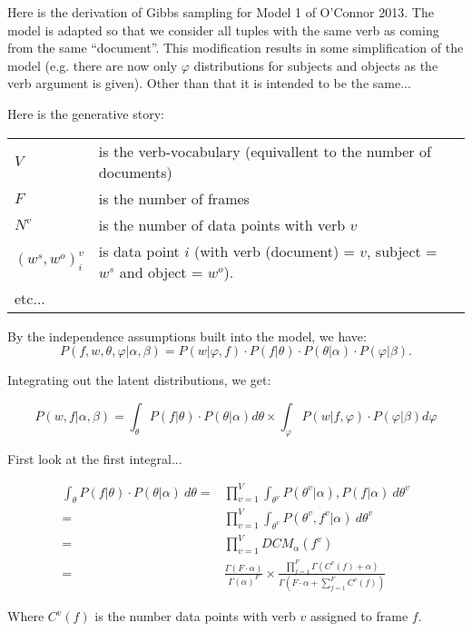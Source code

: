 \documentclass{article}
\renewcommand\phi\varphi
\begin{document}
Here is the derivation of Gibbs sampling for Model 1 of O'Connor 2013.
The model is adapted so that we consider all tuples with the same verb as coming
from the same ``document''.
This modification results in some simplification of the model (e.g. there are now
only $\phi$ distributions for subjects and objects as the verb argument is given).
Other than that it is intended to be the same...

Here is the generative story:



\begin{table}[h]
\begin{tabular}{ll}
$V$ & is the verb-vocabulary (equivallent to the number of documents)\\
$F$ & is the number of frames\\
$N^v$ & is the number of data points with verb $v$\\
$(w^s, w^o)^v_i$ & is data point $i$ (with verb (document) = $v$, subject = $w^s$ and object = $w^o$).\\
etc...\\
\end{tabular}
\end{table}

By the independence assumptions built into the model, we have:
\[
P(f,w,\theta,\phi|\alpha,\beta) = P(w|\phi,f) \cdot P(f|\theta) \cdot P(\theta|\alpha) \cdot P(\phi|\beta).
\]

Integrating out the latent distributions, we get:

\[
P(w,f|\alpha,\beta) = \int_\theta P(f|\theta)\cdot P(\theta|\alpha) d\theta \times
                      \int_\phi   P(w|f,\phi)\cdot P(\phi|\beta) d\phi
\]

First look at the first integral...

\begin{align*}
\int_{\theta} P(f|\theta)\cdot P(\theta|\alpha)\ d\theta
    =& \prod_{v=1}^V \int_{\theta^v} P(\theta^v|\alpha), P(f|\alpha)\ d\theta^v\\
    =& \prod_{v=1}^V \int_{\theta^v} P(\theta^v,f^v|\alpha)\ d\theta^v\\
    =& \prod_{v=1}^V DCM_\alpha(f^v)\\
    =& \frac{\Gamma(F\cdot\alpha)}{\Gamma(\alpha)^F} \times
       \frac{\prod_{f=1}^F\Gamma(C^v(f) + \alpha)}{\Gamma(F\cdot\alpha +
       \sum_{f=1}^FC^v(f))}
\end{align*}

Where $C^v(f)$ is the number data points with verb $v$ assigned to frame $f$.
\end{document}
